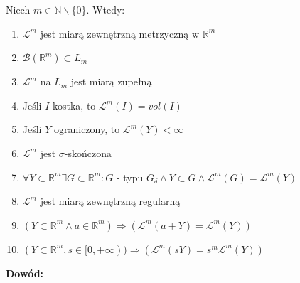 \begin{tw}
    Niech $m \in \mathbb{N} \backslash \{0\}$. Wtedy:
    \begin{enumerate}
    \item $\mathcal{L}^m$ jest miarą zewnętrzną metrzyczną w $\mathbb{R}^m$
    \item $\mathcal{B}(\mathbb{R}^m) \subset L_m$
    \item $\mathcal{L}^m$ na $L_m$ jest miarą zupełną 
    \item Jeśli $I$ kostka, to $\mathcal{L}^m(I) = vol(I)$
    \item Jeśli $Y$ ograniczony, to $\mathcal{L}^m(Y) < \infty$
    \item $\mathcal{L}^m$ jest $\sigma$-skończona
    \item $\forall Y \subset \mathbb{R}^m \exists G \subset \mathbb{R}^m: G$ - typu $G_{\delta} \wedge Y \subset G \wedge \mathcal{L}^m(G) = \mathcal{L}^m(Y)$ 
    \item $\mathcal{L}^m$ jest miarą zewnętrzną regularną 
    \item $(Y \subset \mathbb{R}^m \wedge a \in \mathbb{R}^m) \Longrightarrow (\mathcal{L}^m(a + Y) = \mathcal{L}^m(Y))$ 
    \item $(Y \subset \mathbb{R}^m, s \in [0, +\infty)) \Longrightarrow (\mathcal{L}^m(sY) = s^m\mathcal{L}^m(Y))$
    \end{enumerate}

    \textbf{Dowód:} \citep[3.41]{Tworzewski}
\end{tw}